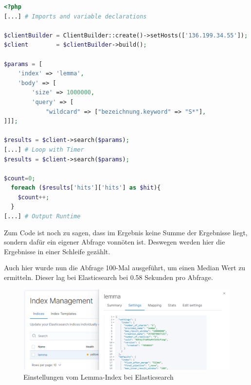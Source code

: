 \begin{lstlisting}[language=php, frame=single, label={lst:phpElastic}, morekeywords={type,uninvertible,indexed,stored,field,multiValued, name}] 
<?php
[...] # Imports and variable declarations

$clientBuilder = ClientBuilder::create()->setHosts(['136.199.34.55']);
$client        = $clientBuilder->build();

$params = [
    'index' => 'lemma',
    'body' => [
        'size' => 1000000,
        'query' => [
            "wildcard" => ["bezeichnung.keyword" => "S*"],
]]];

$results = $client->search($params);
[...] # Loop with Timer  
$results = $client->search($params);

$count=0;
  foreach ($results['hits']['hits'] as $hit){
    $count++;
  }
[...] # Output Runtime
\end{lstlisting}

Zum Code ist noch zu sagen, dass im Ergebnis keine Summe der Ergebnisse liegt, sondern dafür ein eigener Abfrage vonnöten ist. Deswegen werden hier die Ergebnisse in einer Schleife gezählt.

Auch hier wurde nun die Abfrage 100-Mal ausgeführt, um einen Median Wert zu ermitteln. Dieser lag bei Elasticsearch bei 0.58 Sekunden pro Abfrage.

\begin{figure}
	\centering
	\includegraphics[width=1\linewidth]{images/elastic_index_settings.png}
	\caption{Einstellungen vom Lemma-Index bei Elasticsearch}
	\label{img:elasticIndexSettings}
\end{figure}


